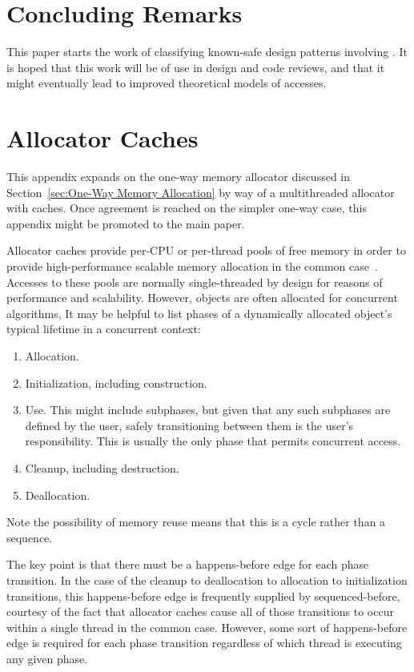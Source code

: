 \documentclass[10]{article}
\begin{document}
\section{Concluding Remarks}
\label{sec:Concluding Remarks}

This paper starts the work of classifying known-safe design patterns
involving .
It is hoped that this work will be of use in design and code reviews,
and that it might eventually lead to improved theoretical models of
 accesses.

\clearpage
\appendix

\section{Allocator Caches}
\label{sec:Allocator Caches}

This appendix expands on the one-way memory allocator discussed in
Section~\ref{sec:One-Way Memory Allocation}
by way of a multithreaded allocator with caches.
Once agreement is reached on the simpler one-way case, this appendix
might be promoted to the main paper.

Allocator caches provide per-CPU or per-thread pools of free memory
in order to provide high-performance scalable memory allocation in
the common case~\cite{McKenney93,Bonwick94slab}.
Accesses to these pools are normally single-threaded by design for
reasons of performance and scalability.
However, objects are often allocated for concurrent algorithms,
It may be helpful to list phases of a dynamically allocated object's
typical lifetime in a concurrent context:

\begin{enumerate}
\item	Allocation.
\item	Initialization, including construction.
\item	Use.
	This might include subphases, but given that any such
	subphases are defined by the user, safely transitioning between
	them is the user's responsibility.
	This is usually the only phase that permits concurrent access.
\item	Cleanup, including destruction.
\item	Deallocation.
\end{enumerate}

Note the possibility of memory reuse means that this is a cycle rather
than a sequence.

The key point is that there must be a happens-before edge for each
phase transition.
In the case of the cleanup to deallocation to allocation to initialization
transitions, this happens-before edge is frequently supplied by
sequenced-before, courtesy of the fact that allocator caches cause
all of those transitions to occur within a single thread in the common
case.
However, some sort of happens-before edge is required for each phase
transition regardless of which thread is executing any given phase.
\end{document}

